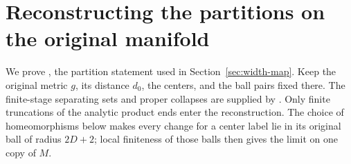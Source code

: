 \section{Reconstructing the partitions on the original manifold}
\label{sec:reconstruction}

We prove , the partition statement used in
Section~\ref{sec:width-map}. Keep the original metric $g$, its distance
$d_0$, the centers, and the ball pairs fixed there. The finite-stage
separating sets and proper collapses are supplied by .
Only finite truncations of the analytic product ends enter the
reconstruction. The choice of homeomorphisms below makes every change
for a center label lie in its original ball of radius $2D+2$; local
finiteness of those balls then gives the limit on one copy of $M$.

